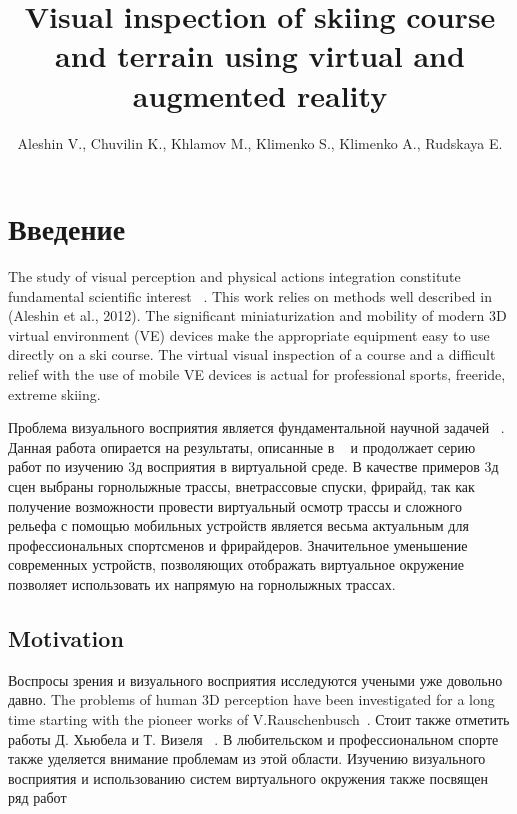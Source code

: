 \documentclass[twoside]{article}
\begin{document}
\title{Visual inspection of skiing course and terrain using virtual and augmented reality}

\author{
	{Aleshin V., Chuvilin K., Khlamov M., Klimenko S., Klimenko A., Rudskaya E.}
}
\date{}
\maketitle

\section{Введение}\label{intro}

The study of visual perception and physical actions integration constitute fundamental scientific interest ~\cite{Bulthoff-bib1}.
This work relies on methods well described in (Aleshin et al., 2012).
The significant miniaturization and mobility of modern 3D virtual environment (VE) devices make the appropriate equipment easy to use directly on a ski course. 
The virtual visual inspection of a course and a difficult relief with the use of mobile VE devices is actual for professional sports, freeride, extreme skiing.

Проблема визуального восприятия является фундаментальной научной задачей ~\cite{Bulthoff-bib1}.
Данная работа опирается на результаты, описанные в ~\cite{Aleshin-2012-bib2} и продолжает серию работ по изучению 3д восприятия в виртуальной
среде.
В качестве примеров 3д сцен выбраны горнолыжные трассы, внетрассовые спуски, фрирайд, так как получение возможности провести виртуальный осмотр трассы 
и сложного рельефа с помощью мобильных устройств является весьма актуальным для профессиональных спортсменов и фрирайдеров.
Значительное уменьшение современных устройств, позволяющих отображать виртуальное окружение позволяет использовать их напрямую на горнолыжных трассах.

\subsection{Motivation}
Воспросы зрения и визуального восприятия исследуются учеными уже довольно давно.
The problems of human 3D perception have been investigated for a long time starting with the pioneer works of V.\;Rauschenbusch~\cite{Rauschenbusch-bib3}.
Стоит также отметить работы Д. Хьюбела и Т. Визеля ~\cite{Hubel-1988-bib4, Hubel-Wiesel-bib5}.
В любительском и профессиональном спорте также уделяется внимание проблемам из этой области.
Изучению визуального восприятия и использованию систем виртуального окружения также посвящен ряд работ ~\cite{Zaichkowsky-2012-bib6, Bideau-2010-bib7}
\end{document}
